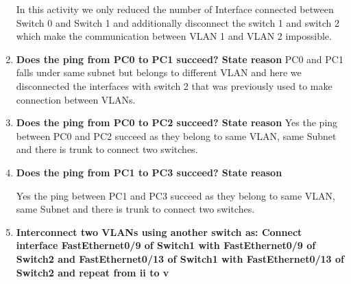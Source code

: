 \documentclass[a4paper,11pt]{article}
\begin{document}
\begin{enumerate}






          In this activity we only reduced the number of Interface connected between Switch 0 and Switch 1 and additionally disconnect the switch 1 and switch 2 which make the communication between VLAN 1 and VLAN 2 impossible.

    \item\textbf{  Does the ping from PC0 to PC1 succeed? State reason}
          PC0 and PC1 falls under same subnet but belongs to different VLAN and here we disconnected the interfaces with switch 2 that was previously used to make connection between VLANs.


    \item\textbf{  Does the ping from PC0 to PC2 succeed? State reason}
          Yes the ping between PC0 and PC2 succeed as they belong to same VLAN, same Subnet and there is trunk to connect two switches.

    \item\textbf{  Does the ping from PC1 to PC3 succeed? State reason}

          Yes the ping between PC1 and PC3 succeed as they belong to same VLAN, same Subnet and there is trunk to connect two switches.

    \item\textbf{  Interconnect two VLANs using another switch as: Connect interface FastEthernet0/9 of
              Switch1 with FastEthernet0/9 of Switch2 and FastEthernet0/13 of Switch1 with
              FastEthernet0/13 of Switch2 and repeat from ii to v}



\end{enumerate}
\end{document}

